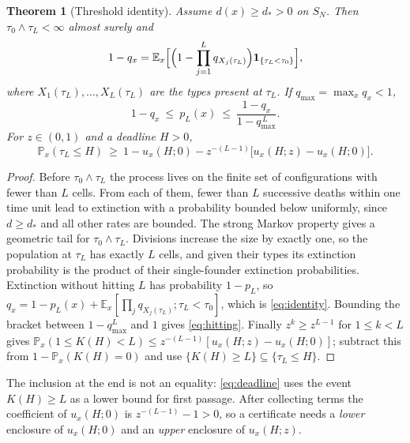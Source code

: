 \documentclass[11pt]{article}
\newtheorem{theorem}{Theorem}
\theoremstyle{remark}
\newcommand{\one}{\mathbf 1}
\newcommand{\E}{\mathbb E}
\newcommand{\PP}{\mathbb P}
\begin{document}
\begin{theorem}[Threshold identity]\label{thm:threshold}
Assume $d(x)\ge d_*>0$ on $S_N$. Then $\tau_0\wedge\tau_L<\infty$ almost
surely and
\begin{equation}\label{eq:identity}
 1-q_x=\E_x\Bigl[\Bigl(1-\prod_{j=1}^Lq_{X_j(\tau_L)}\Bigr)\one_{\{\tau_L<\tau_0\}}\Bigr],
\end{equation}
where $X_1(\tau_L),\dots,X_L(\tau_L)$ are the types present at $\tau_L$. If
$q_{\max}=\max_xq_x<1$,
\begin{equation}\label{eq:hitting}
 1-q_x\ \le\ p_L(x)\ \le\ \frac{1-q_x}{1-q_{\max}^{\,L}} .
\end{equation}
For $z\in(0,1)$ and a deadline $H>0$,
\begin{equation}\label{eq:deadline}
 \PP_x(\tau_L\le H)\ \ge\ 1-u_x(H;0)-z^{-(L-1)}\bigl[u_x(H;z)-u_x(H;0)\bigr].
\end{equation}
\end{theorem}
\begin{proof}
Before $\tau_0\wedge\tau_L$ the process lives on the finite set of
configurations with fewer than $L$ cells. From each of them, fewer than $L$
successive deaths within one time unit lead to extinction with a probability
bounded below uniformly, since $d\ge d_*$ and all other rates are bounded.
The strong Markov property gives a geometric tail for $\tau_0\wedge\tau_L$.
Divisions increase the size by exactly one, so the population at $\tau_L$ has
exactly $L$ cells, and given their types its extinction probability is the
product of their single-founder extinction probabilities. Extinction without
hitting $L$ has probability $1-p_L$, so
$q_x=1-p_L(x)+\E_x[\prod_jq_{X_j(\tau_L)};\tau_L<\tau_0]$, which is
\eqref{eq:identity}. Bounding the bracket between $1-q_{\max}^L$ and $1$ gives
\eqref{eq:hitting}. Finally $z^k\ge z^{L-1}$ for $1\le k<L$ gives
$\PP_x(1\le K(H)<L)\le z^{-(L-1)}[u_x(H;z)-u_x(H;0)]$; subtract this from
$1-\PP_x(K(H)=0)$ and use $\{K(H)\ge L\}\subseteq\{\tau_L\le H\}$.
\end{proof}
The inclusion at the end is not an equality: \eqref{eq:deadline} uses the
event $K(H)\ge L$ as a lower bound for first passage. After collecting terms
the coefficient of $u_x(H;0)$ is $z^{-(L-1)}-1>0$, so a certificate needs a
\emph{lower} enclosure of $u_x(H;0)$ and an \emph{upper} enclosure of
$u_x(H;z)$.
\end{document}
